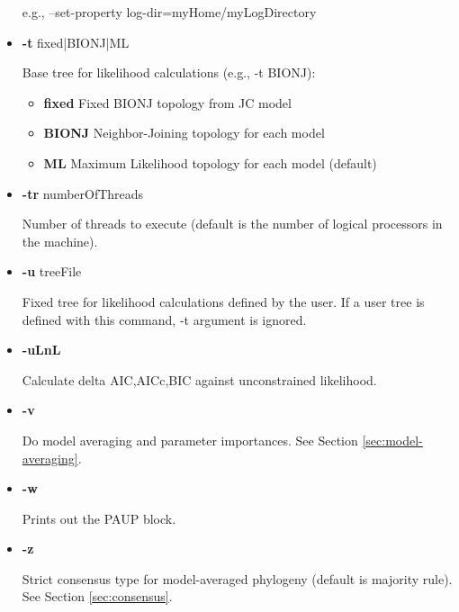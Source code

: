 \begin{itemize}
e.g., --set-property log-dir=myHome/myLogDirectory

\item  {\bf -t} fixed|BIONJ|ML

Base tree for likelihood calculations (e.g., -t BIONJ):
\begin{itemize}
     \item {\bf fixed}  Fixed BIONJ topology from JC model
     \item {\bf BIONJ}  Neighbor-Joining topology for each model
     \item {\bf ML}     Maximum Likelihood topology for each model (default)
\end{itemize}

\item  {\bf -tr} numberOfThreads

Number of threads to execute (default is the number of logical processors in the machine).

\item  {\bf -u} treeFile

Fixed tree for likelihood calculations defined by the user. If a user tree is defined with this command, -t argument is ignored.

\item  {\bf -uLnL}

Calculate delta AIC,AICc,BIC against unconstrained likelihood.

\item  {\bf -v}

Do model averaging and parameter importances. See Section \ref{sec:model-averaging}.

\item  {\bf -w}

Prints out the PAUP block.

\item  {\bf -z}

Strict consensus type for model-averaged phylogeny (default is majority rule). See Section \ref{sec:consensus}.

\end{itemize}
